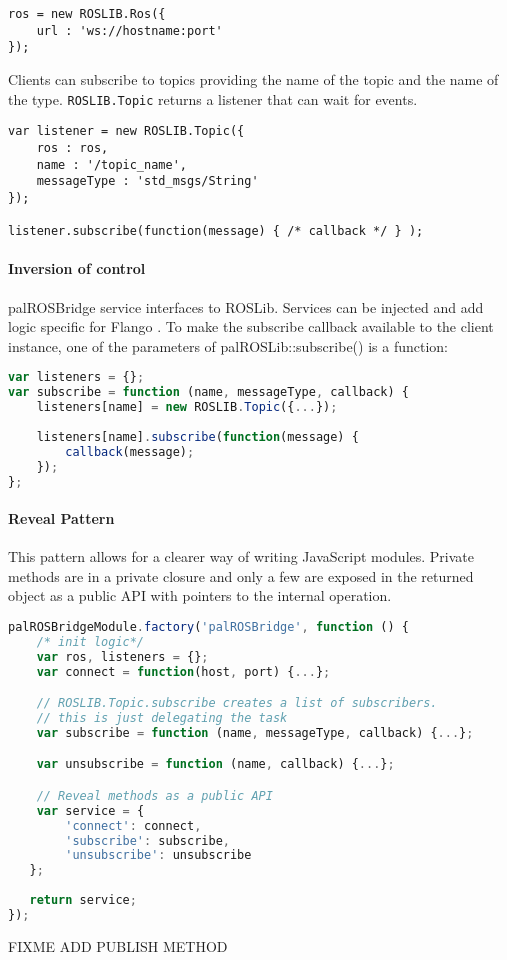 \begin{lstlisting}[caption=ROSLibJS connect method, label=impl-flango-ros-roslib-connect]
ros = new ROSLIB.Ros({
    url : 'ws://hostname:port'
});
\end{lstlisting}

Clients can subscribe to topics providing the name of the topic and the name of the type.
\texttt{ROSLIB.Topic} returns a listener that can wait for events.

\begin{lstlisting}[caption=ROSLibJS subscribe method, label=impl-flango-ros-roslib-subscribe]
var listener = new ROSLIB.Topic({
    ros : ros,
    name : '/topic_name',
    messageType : 'std_msgs/String'
});

listener.subscribe(function(message) { /* callback */ } );
\end{lstlisting}

\paragraph{Inversion of control} palROSBridge service interfaces to ROSLib.
Services can be injected and add logic specific for Flango \cm .
To make the subscribe callback available to the client instance, one of the parameters of palROSLib::subscribe() is a function:

\begin{lstlisting}[language=JavaScript, caption=palROSLib subscribe method, label=impl-flango-ros-palroslib-subscribe]
var listeners = {};
var subscribe = function (name, messageType, callback) {
    listeners[name] = new ROSLIB.Topic({...});
    
    listeners[name].subscribe(function(message) {
        callback(message);
    });
};
\end{lstlisting}

\paragraph{Reveal Pattern} This pattern allows for a clearer way of writing JavaScript modules.
Private methods are in a private closure and only a few are exposed in the returned object as a public \ac{API} with pointers to the internal operation.

\begin{lstlisting}[language=JavaScript, caption=Reveal Pattern in palROSBridge, label=impl-flango-ros-palroslib-reveal]
palROSBridgeModule.factory('palROSBridge', function () {
    /* init logic*/
    var ros, listeners = {};
    var connect = function(host, port) {...};

    // ROSLIB.Topic.subscribe creates a list of subscribers.
    // this is just delegating the task
    var subscribe = function (name, messageType, callback) {...};

    var unsubscribe = function (name, callback) {...};

    // Reveal methods as a public API
    var service = {
        'connect': connect,
        'subscribe': subscribe,
        'unsubscribe': unsubscribe
   };
   
   return service;
});
\end{lstlisting}


FIXME ADD PUBLISH METHOD
